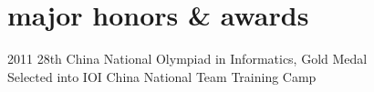 \documentclass[__VERSION__]{friggeri-cv} %
\begin{document}





\section{major honors \& awards}

\begin{entrylist}
  \centry
  {2011}
  {28th China National Olympiad in Informatics, Gold Medal \\
  Selected into IOI China National Team Training Camp}
\end{entrylist}


\end{document}
